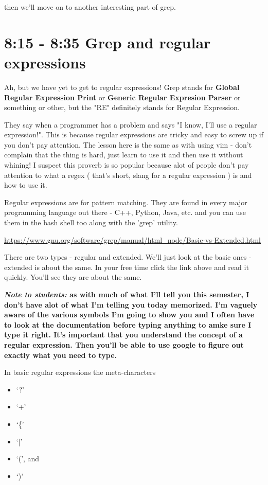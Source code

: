 \documentclass[10pt]{article}
\begin{document}
then we'll move on to another interesting part of grep.

\section{8:15 - 8:35 Grep and regular expressions}

Ah, but we have yet to get to regular expressions! Grep stands for
\textbf{Global Regular Expression Print} or \textbf{Generic Regular Expresion
Parser} or something or other, but the "RE" definitely stands for Regular
Expression.

They say when a programmer has a problem and says "I know, I'll use a regular expression!". This is because regular expressions are tricky and easy to screw up if you don't pay attention. The lesson here is the same as with using vim - don't complain that the thing is hard, just learn to use it and then use it without whining! I suspect this proverb is so popular because alot of people don't pay attention to what a regex ( that's short, slang for a regular expression ) is and how to use it. 

Regular expressions are for pattern matching. They are found in every major programming language out there - C++, Python, Java, etc. and you can use them in the bash shell too along with the 'grep' utility.

\url{https://www.gnu.org/software/grep/manual/html_node/Basic-vs-Extended.html}

There are two types - regular and extended. We'll just look at the basic ones - extended is about the same. In your free time click the link above and read it quickly. You'll see they are about the same.

{\Large\textbf{\textit{Note to students:} as with much of what I'll tell you this
semester, I don't have alot of what I'm telling you today memorized. I'm vaguely
aware of the various symbols I'm going to show you and I often have to look at
the documentation before typing anything to amke sure I type it right. It's
important that you understand the concept of a regular expression. Then you'll
be able to use google to figure out exactly what you need to type.}}

In basic regular expressions the meta-characters
\begin{itemize}
\item `?'
\item `+'
\item `\{'
\item `|'
\item `(', and
\item `)'
\end{itemize}
\end{document}
